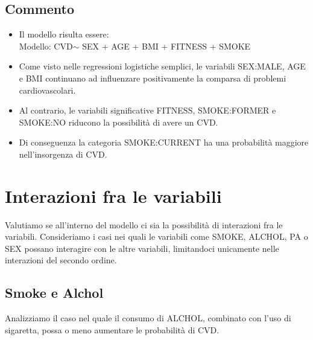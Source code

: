 \documentclass{article}\usepackage[]{graphicx}\usepackage[]{xcolor}
\begin{document}
  \subsection{Commento}
    \begin{itemize}
      \item Il modello risulta essere: \\
            Modello: CVD$\sim$ SEX + AGE + BMI + FITNESS + SMOKE
      \item Come visto nelle regressioni logistiche semplici, le variabili
            SEX:MALE, AGE e BMI continuano ad influenzare positivamente la 
            comparsa di problemi cardiovascolari.
      \item Al contrario, le variabili significative FITNESS, SMOKE:FORMER e
            SMOKE:NO riducono la possibilità di avere un CVD.
      \item Di conseguenza la categoria SMOKE:CURRENT ha una probabilità 
            maggiore nell'insorgenza di CVD.
    \end{itemize}
  
\clearpage    


\section{Interazioni fra le variabili}
  Valutiamo se all'interno del modello ci sia la possibilità di interazioni
  fra le variabili. 
  Consideriamo i casi nei quali le variabili come SMOKE, ALCHOL, PA o SEX possano 
  interagire con le altre variabili, limitandoci unicamente nelle interazioni 
  del secondo ordine.
  
  \subsection{Smoke e Alchol}
    Analizziamo il caso nel quale il consumo di ALCHOL, combinato con l'uso di 
    sigaretta, possa o meno aumentare le probabilità di CVD.
    
\end{document}
